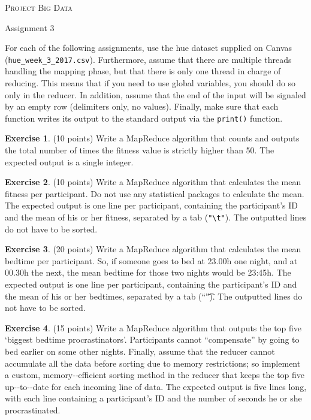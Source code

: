 \documentclass[a4paper]{report}
\theoremstyle{definition}
\newtheorem{exercise}{Exercise}
\newcommand{\blankline}{\par\vspace{5mm}}
\begin{document}
\begin{center}
    \textsc{\Large Project Big Data}
    \blankline
    
    {\large Assignment 3}
\end{center}

For each of the following assignments, use the hue dataset supplied on
Canvas (\texttt{\small hue\_week\_3\_2017.csv}). Furthermore, assume
that there are multiple threads handling the mapping phase, but that
there is only one thread in charge of reducing. This means that if you
need to use global variables, you should do so only in the reducer. In
addition, assume that the end of the input will be signaled by an empty
row (delimiters only, no values). Finally, make sure that each function
writes its output to the standard output via the \texttt{\small print()} function.

\begin{exercise}
(10 points) Write a MapReduce algorithm that counts and outputs the
total number of times the fitness value is strictly higher than 50. The
expected output is a single integer.
\end{exercise}

\begin{exercise}
(10 points) Write a MapReduce algorithm that calculates the mean fitness
per participant. Do not use any statistical packages to calculate
the mean. The expected output is one line per participant, containing
the participant’s ID and the mean of his or her fitness, separated by
a tab (\texttt{\small "\textbackslash{}t"}). The outputted lines do not have to be sorted.
\end{exercise}

\begin{exercise}
(20 points) Write a MapReduce algorithm that calculates the mean bedtime
per participant. So, if someone goes to bed at 23.00h one night,
and at 00.30h the next, the mean bedtime for those two nights would
be 23:45h. The expected output is one line per participant, containing
the participant’s ID and the mean of his or her bedtimes, separated
by a tab (“\t”). The outputted lines do not have to be sorted.
\end{exercise}

\begin{exercise}
(15 points) Write a MapReduce algorithm that outputs the top
five ‘biggest bedtime procrastinators’. Participants cannot
“compensate” by going to bed earlier on some other nights. Finally,
assume that the reducer cannot accumulate all the data before sorting
due to memory restrictions; so implement a custom, memory-­‐efficient
sorting method in the reducer that keeps the top five up-­‐to-­‐date
for each incoming line of data. The expected output is five lines long,
with each line containing a participant's ID and the number of seconds
he or she procrastinated.
\end{exercise}
\end{document}
